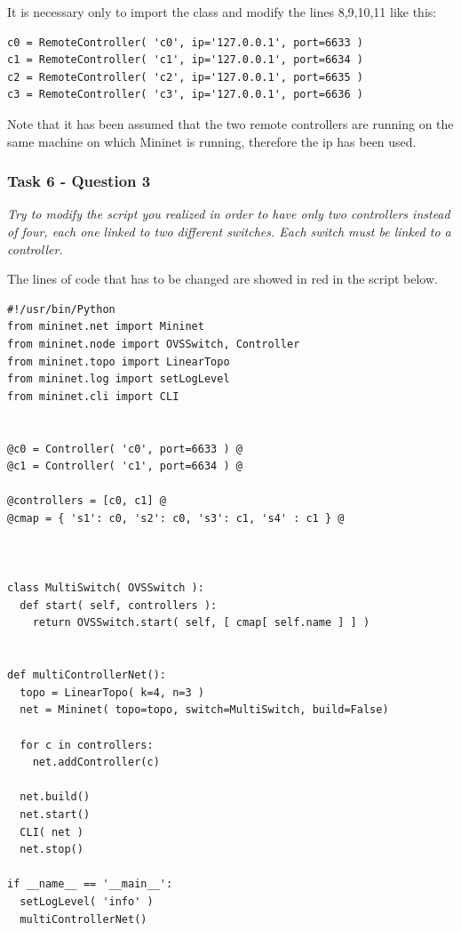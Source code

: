 It is necessary only to import the class  and modify the
lines 8,9,10,11 like this:

\begin{lstlisting}
c0 = RemoteController( 'c0', ip='127.0.0.1', port=6633 )
c1 = RemoteController( 'c1', ip='127.0.0.1', port=6634 )
c2 = RemoteController( 'c2', ip='127.0.0.1', port=6635 )
c3 = RemoteController( 'c3', ip='127.0.0.1', port=6636 )
\end{lstlisting}

Note that it has been assumed that the two remote controllers are running on the
same machine on which Mininet is running, therefore the ip  has
been used.


\subsubsection*{Task 6 - Question 3}
\textit{Try to modify the script you realized in order to have only
two controllers instead of four, each one linked to two different
switches. Each switch must be linked to a controller.}

The lines of code that has to be changed are showed in red in the script below.

\begin{minipage}{\linewidth}
\begin{lstlisting}
#!/usr/bin/Python
from mininet.net import Mininet
from mininet.node import OVSSwitch, Controller
from mininet.topo import LinearTopo
from mininet.log import setLogLevel
from mininet.cli import CLI


@c0 = Controller( 'c0', port=6633 ) @
@c1 = Controller( 'c1', port=6634 ) @

@controllers = [c0, c1] @
@cmap = { 's1': c0, 's2': c0, 's3': c1, 's4' : c1 } @



class MultiSwitch( OVSSwitch ):
  def start( self, controllers ):
    return OVSSwitch.start( self, [ cmap[ self.name ] ] )


def multiControllerNet():
  topo = LinearTopo( k=4, n=3 )
  net = Mininet( topo=topo, switch=MultiSwitch, build=False)

  for c in controllers:
    net.addController(c)

  net.build()
  net.start()
  CLI( net )
  net.stop()

if __name__ == '__main__':
  setLogLevel( 'info' )
  multiControllerNet()
\end{lstlisting}
\end{minipage}






